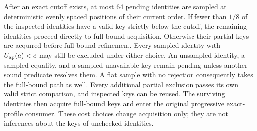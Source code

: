 \documentclass[11pt]{article}
\begin{document}
After an exact cutoff exists, at most $64$ pending identities are sampled at deterministic evenly spaced positions of their current order. If fewer than $1/8$ of the inspected identities have a valid key strictly below the cutoff, the remaining identities proceed directly to full-bound acquisition. Otherwise their partial keys are acquired before full-bound refinement. Every sampled identity with $U_{\rm ap}(a)<c$ may still be excluded under either choice. An unsampled identity, a sampled equality, and a sampled unavailable key remain pending unless another sound predicate resolves them. A flat sample with no rejection consequently takes the full-bound path as well. Every additional partial exclusion passes its own valid strict comparison, and inspected keys can be reused. The surviving identities then acquire full-bound keys and enter the original progressive exact-profile consumer. These cost choices change acquisition only; they are not inferences about the keys of unchecked identities.
\end{document}
